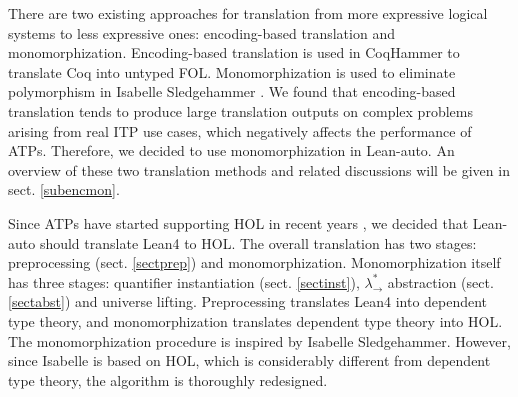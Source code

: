  There are two existing approaches for translation from more expressive
  logical systems to less expressive ones: encoding-based translation and monomorphization.
  Encoding-based translation is used in CoqHammer \cite{Czajka2018HammerFC}
  to translate Coq into untyped FOL. Monomorphization is used to
  eliminate polymorphism in Isabelle Sledgehammer \cite{Blanchette2016HammeringTQ}\cite{Paulson2012ThreeYO}.
  We found that encoding-based translation tends to produce large translation outputs
  on complex problems arising from real ITP use cases, which negatively affects the performance of ATPs.
  Therefore, we decided to use monomorphization in Lean-auto. An overview of these two
  translation methods and related discussions will be given in sect. \ref{subencmon}.

  Since ATPs have started supporting HOL in recent years \cite{HOVampire}\cite{ZipperpositionMakeWork}\cite{HOEProver},
  we decided that Lean-auto should translate Lean4 to HOL. The overall translation has
  two stages: preprocessing (sect. \ref{sectprep}) and monomorphization.
  Monomorphization itself has three stages: quantifier instantiation (sect. \ref{sectinst}),
  $\lambda_\to^*$ abstraction (sect. \ref{sectabst}) and universe lifting. Preprocessing translates Lean4
  into dependent type theory, and monomorphization translates dependent type theory
  into HOL. The monomorphization procedure is inspired by Isabelle Sledgehammer.
  However, since Isabelle is based on HOL, which is considerably different from
  dependent type theory, the algorithm is thoroughly redesigned.